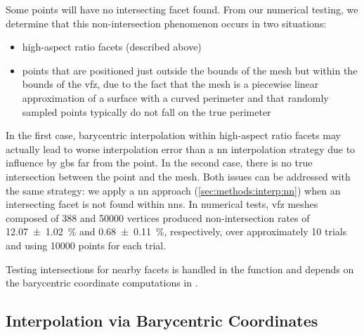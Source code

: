 \documentclass[final,twocolumn,12pt]{elsarticle}
\begin{document}
\begin{appendices}
Some \outpt{} points will have no intersecting facet found.
From our numerical testing, we determine that this non-intersection phenomenon occurs in two situations:
\begin{itemize}
    \item high-aspect ratio facets (described above)
    \item \outpt{} points that are positioned just outside the bounds of the mesh but within the bounds of the \gls{vfz}, due to the fact that the mesh is a piecewise linear approximation of a surface with a curved perimeter and that randomly sampled points typically do not fall on the true perimeter
\end{itemize}
In the first case, barycentric interpolation within high-aspect ratio facets may actually lead to worse interpolation error than a \gls{nn} interpolation strategy due to influence by \glspl{gb} far from the \outpt{} point. In the second case, there is no true intersection between the \outpt{} point and the mesh. Both issues can be addressed with the same strategy: we apply a \gls{nn} approach (\cref{sec:methods:interp:nn}) when an intersecting facet is not found within  \glspl{nn}. In numerical tests, \gls{vfz} meshes composed of \num{388} and \num{50000} vertices produced non-intersection rates of \SI{12.07 \pm 1.02}{\percent} and \SI{0.68 \pm 0.11}{\percent}, respectively, over approximately \num{10} trials and using \num{10000} \outpt{} points for each trial.

Testing intersections for nearby facets is handled in the \vfzorepo{} function  and depends on the barycentric coordinate computations in .

\subsection{Interpolation via Barycentric Coordinates}
\label{sec:app:bary-interp}


\end{appendices}
\end{document}
